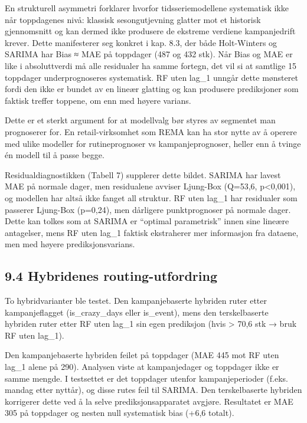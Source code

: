 \documentclass[
  norsk,
  11pt,
  a4paper,
]{article}
\begin{document}
En strukturell asymmetri forklarer hvorfor tidsseriemodellene
systematisk ikke når toppdagenes nivå: klassisk sesongutjevning glatter
mot et historisk gjennomsnitt og kan dermed ikke produsere de ekstreme
verdiene kampanjedrift krever. Dette manifesterer seg konkret i kap.
8.3, der både Holt-Winters og SARIMA har \textbar Bias\textbar{} ≈ MAE
på toppdager (487 og 432 stk). Når Bias og MAE er like i absoluttverdi
må alle residualer ha samme fortegn, det vil si at samtlige 15 toppdager
underprognoseres systematisk. RF uten lag\_1 unngår dette mønsteret
fordi den ikke er bundet av en lineær glatting og kan produsere
prediksjoner som faktisk treffer toppene, om enn med høyere varians.

Dette er et sterkt argument for at modellvalg bør styres av segmentet
man prognoserer for. En retail-virksomhet som REMA kan ha stor nytte av
å operere med ulike modeller for rutineprognoser vs kampanjeprognoser,
heller enn å tvinge én modell til å passe begge.

Residualdiagnostikken (Tabell 7) supplerer dette bildet. SARIMA har
lavest MAE på normale dager, men residualene avviser Ljung-Box (Q=53,6,
p\textless0,001), og modellen har altså ikke fanget all struktur. RF
uten lag\_1 har residualer som passerer Ljung-Box (p=0,24), men
dårligere punktprognoser på normale dager. Dette kan tolkes som at
SARIMA er ``optimal parametrisk'' innen sine lineære antagelser, mens RF
uten lag\_1 faktisk ekstraherer mer informasjon fra dataene, men med
høyere prediksjonsvarians.

\subsection{9.4 Hybridenes
routing-utfordring}\label{hybridenes-routing-utfordring}

To hybridvarianter ble testet. Den kampanjebaserte hybriden ruter etter
kampanjeflagget (is\_crazy\_days eller is\_event), mens den
terskelbaserte hybriden ruter etter RF uten lag\_1 sin egen prediksjon
(hvis \textgreater{} 70,6 stk → bruk RF uten lag\_1).

Den kampanjebaserte hybriden feilet på toppdager (MAE 445 mot RF uten
lag\_1 alene på 290). Analysen viste at kampanjedager og toppdager ikke
er samme mengde. I testsettet er det toppdager utenfor kampanjeperioder
(f.eks. mandag etter nyttår), og disse rutes feil til SARIMA. Den
terskelbaserte hybriden korrigerer dette ved å la selve
prediksjonsapparatet avgjøre. Resultatet er MAE 305 på toppdager og
nesten null systematisk bias (+6,6 totalt).
\end{document}
